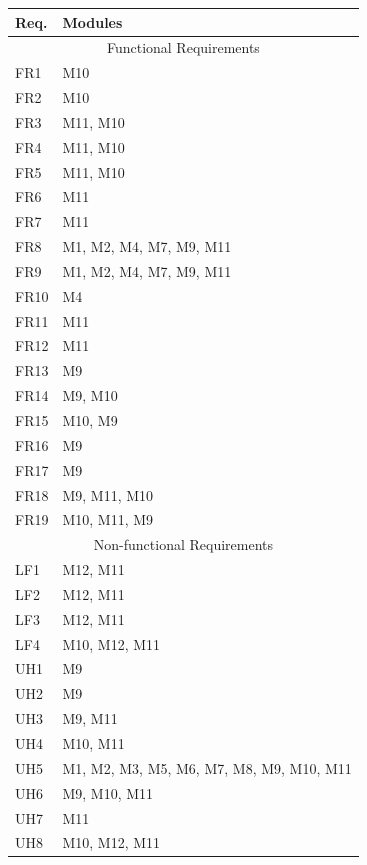 \documentclass[12pt, titlepage]{article}
\begin{document}
\begin{table}[H]
\color{blue}
\centering
\begin{tabular}{p{} p{}}
\toprule
\textbf{Req.} & \textbf{Modules}\\
\midrule
\multicolumn{2}{c}{Functional Requirements} \\
\midrule
FR1 & M10\\
FR2 & M10\\
FR3 & M11, M10\\
FR4 & M11, M10\\
FR5 & M11, M10\\
FR6 & M11\\
FR7 & M11\\
FR8 &  M1, M2, M4, M7, M9, M11\\
FR9 &  M1, M2, M4, M7, M9, M11\\
FR10 & M4\\
FR11 & M11\\
FR12 & M11\\
FR13 & M9\\
FR14 & M9, M10\\
FR15 & M10, M9\\
FR16 & M9\\
FR17 & M9\\
FR18 & M9, M11, M10\\
FR19 & M10, M11, M9\\

\midrule
\multicolumn{2}{c}{Non-functional Requirements}\\
\midrule


LF1 &  M12, M11\\
LF2 &  M12, M11\\
LF3 &  M12, M11\\
LF4 &  M10, M12, M11\\
UH1 & M9\\
UH2 & M9\\
UH3 & M9, M11\\
UH4 & M10, M11\\
UH5 &  M1, M2, M3, M5, M6, M7, M8, M9, M10, M11 \\
UH6 & M9, M10, M11\\
UH7 & M11\\
UH8 & M10, M12, M11\\

\bottomrule
\end{tabular}
\end{table}
\end{document}
